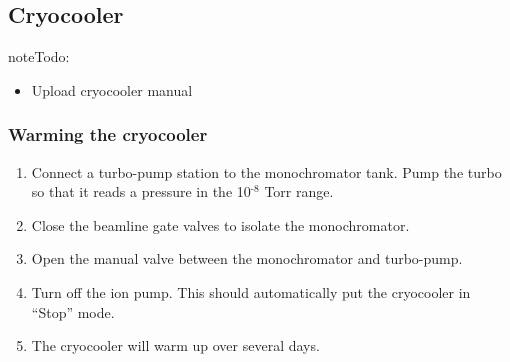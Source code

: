 \documentclass[letterpaper,10pt,english]{sphinxmanual}
\begin{document}
\subsection{Cryocooler}
\label{\detokenize{staff:cryocooler}}

\begin{sphinxadmonition}{note}{\label{staff:index-3}Todo:}\begin{itemize}
\item {} 
Upload cryocooler manual

\end{itemize}
\end{sphinxadmonition}


\subsubsection{Warming the cryocooler}
\label{\detokenize{staff:warming-the-cryocooler}}\begin{enumerate}
\def\theenumi{\arabic{enumi}}
\def\labelenumi{\theenumi .}
\makeatletter\def\p@enumii{\p@enumi \theenumi .}\makeatother
\item {} 
Connect a turbo-pump station to the monochromator tank. Pump the turbo so that it reads a pressure in the 10$^{\text{-8}}$ Torr range.

\item {} 
Close the beamline gate valves to isolate the monochromator.

\item {} 
Open the manual valve between the monochromator and turbo-pump.

\item {} 
Turn off the ion pump. This should automatically put the cryocooler in “Stop” mode.

\item {} 
The cryocooler will warm up over several days.

\end{enumerate}
\end{document}
